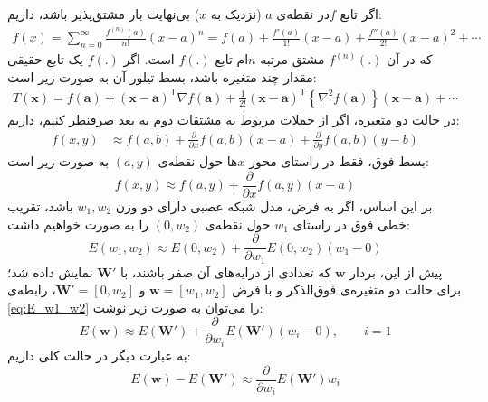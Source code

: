 \documentclass[11pt, twoside]{imsproc}
\begin{document}
اگر تابع $f$‌در نقطه‌ی $a$ (نزدیک به $x$) بی‌نهایت بار مشتق‌پذیر باشد،‌ داریم:
\begin{align}
f(x) = \sum_{n=0} ^ {\infty} \frac {f^{(n)}(a)}{n!} (x-a)^{n}
= f(a)+\frac {f'(a)}{1!} (x-a)+ \frac{f''(a)}{2!} (x-a)^2+ \cdots %
\end{align}
که در آن
$f^{(n)}(.)$
مشتق مرتبه $n$ام تابع $f(.)$ است.
اگر $f(.)$ یک تابع حقیقی مقدار چند متغیره باشد،‌ بسط تیلور آن به صورت زیر است:
\begin{align}
T(\mathbf{x}) = f(\mathbf{a}) + (\mathbf{x} - \mathbf{a})^\mathsf{T} \nabla f(\mathbf{a})%
+ \frac{1}{2!} (\mathbf{x} - \mathbf{a})^\mathsf{T} \left \{\nabla^2 f(\mathbf{a}) \right \} (\mathbf{x} - \mathbf{a}) + \cdots
\end{align}
در حالت دو متغیره،‌ اگر از جملات مربوط به مشتقات دوم به بعد صرفنظر کنیم، داریم:
\begin{align}
f(x,y) &\approx f(a,b) +\frac{\partial }{\partial x}f(a,b)(x-a)  + \frac{\partial }{\partial y}f(a,b) (y-b)
\end{align}
بسط فوق، فقط در راستای محور $x$ها حول نقطه‌ی
$(a,y)$
به صورت زیر است:
$$f(x,y) \approx f(a,y) + \frac{\partial }{\partial x}f(a,y)(x-a) $$
بر این اساس،‌ اگر به فرض، مدل شبکه عصبی دارای دو وزن
$w_1,w_2$
باشد،‌ تقریب خطی فوق  در راستای
$w_1$
حول نقطه‌ی
$(0,w_2)$
را به صورت خواهیم داشت:
\begin{equation}
\label{eq:E_w1_w2}
E(w_1,w_2) \approx E(0,w_2) + \frac{\partial}{\partial w_1}E(0,w_2)(w_1-0)
\end{equation}
پیش از این، بردار
$\mathbf{w}$
که تعدادی از درایه‌های آن صفر باشند، با
$\mathbf{W'}$
نمایش داده شد؛  برای حالت دو متغیره‌ی فوق‌الذکر و با فرض
$\mathbf{w}=[w_1,w_2]$
و
$\mathbf{W'}=[0,w_2]$،
رابطه‌ی
  \eqref{eq:E_w1_w2}
را می‌توان به صورت زیر نوشت:
\begin{equation}
E(\mathbf{w}) \approx E(\mathbf{W'}) + \frac{\partial}{\partial w_i}E(\mathbf{W'})(w_i-0),  \qquad i=1
\end{equation}
به عبارت دیگر در حالت کلی داریم:
\begin{equation}
E(\mathbf{w})-E(\mathbf{W'}) \approx  \frac{\partial}{\partial w_i}E(\mathbf{W'})w_i
\end{equation}
\end{document}
